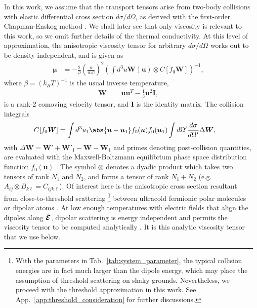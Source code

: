\documentclass[reprint, amsmath, amssymb, aps, superscriptaddress]{revtex4-1}
\begin{document}
In this work, we assume that the transport tensors arise from two-body collisions with elastic differential cross section $d\sigma / d\Omega$, as derived with the first-order Chapman-Enskog method \cite{Chapman90_CUP, Wang22_PRA, Wang22_PRA2}. We shall later see that only viscosity is relevant to this work, so we omit further details of the thermal conductivity. 
At this level of approximation, the anisotropic viscosity tensor for arbitrary $d\sigma / d\Omega$ works out to be density independent, and is given as \cite{Wang22_PRA2, Wang23_PRA} 
\begin{align} \label{eq:viscosity_tensor} 
    \boldsymbol{\mu} 
    &=
    -\frac{ 2 }{ \beta } \left( \frac{ n }{ m \beta } \right)^2 
    \left(
    \int d^3 u \boldsymbol{W}(\boldsymbol{u}) \otimes C[ f_0 \boldsymbol{W} ]
    \right)^{-1},
\end{align}
where $\beta = ( k_B T )^{-1}$ is the usual inverse temperature, 
\begin{align} 
    \boldsymbol{W}
    &=
    \boldsymbol{u} \boldsymbol{u}^T
    -
    \frac{ 1 }{ 3 }
    \boldsymbol{u}^2
    \boldsymbol{I},
\end{align} 
is a rank-2 comoving velocity tensor, and $\boldsymbol{I}$ is the identity matrix. 
The collision integrals
\begin{align} \label{eq:collision_integral}
    C[ f_0 \boldsymbol{W} ]
    &=
    \int d^3 u_1 
    \abs{ \boldsymbol{u} - \boldsymbol{u}_1 }
    f_0(\boldsymbol{u}) f_0(\boldsymbol{u}_1)
    \int d\Omega'
    \frac{ d\sigma }{ d\Omega' }
    \Delta\boldsymbol{W},
\end{align}
with $\Delta\boldsymbol{W} = \boldsymbol{W}' + \boldsymbol{W}'_1 - \boldsymbol{W} - \boldsymbol{W}_1$ and primes denoting post-collision quantities, 
are evaluated with the Maxwell-Boltzmann equilibrium phase space distribution function $f_0(\boldsymbol{u})$ \cite{Reif09_Waveland}. 
The symbol $\otimes$ denotes a dyadic product which takes two tensors of rank $N_1$ and $N_2$, and forms a tensor of rank $N_1 + N_2$ (e.g. $A_{i j} \otimes B_{k \ell} = C_{i j k \ell}$).  
Of interest here is the anisotropic cross section resultant from close-to-threshold scattering 
\footnote{ With the parameters in Tab.~\ref{tab:system_parameter}, the typical collision energies are in fact much larger than the dipole energy, which may place the assumption of threshold scattering on shaky grounds. Nevertheless, we proceed with the threshold approximation in this work. See App.~\ref{app:threshold_consideration} for further discussions. }
between ultracold fermionic polar molecules or dipolar atoms \cite{Matsuda20_Sci, Schindewolf22_Nat, Patscheider21_PRA, Tang15_PRA}. 
At low enough temperatures with electric fields that align the dipoles along $\hat{\boldsymbol{{\cal E}}}$, dipolar scattering is energy independent and permits the viscosity tensor to be computed analytically \cite{Wang23_PRA}. It is this analytic viscosity tensor that we use below.
\end{document}
